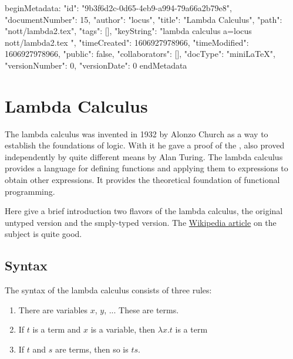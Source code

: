 beginMetadata:
{
    "id": "9b3f6d2c-0d65-4eb9-a994-79a66a2b79e8",
    "documentNumber": 15,
    "author": "locus",
    "title": "Lambda Calculus",
    "path": "nott/lambda2.tex",
    "tags": [],
    "keyString": "lambda calculus a=locus nott/lambda2.tex ",
    "timeCreated": 1606927978966,
    "timeModified": 1606927978966,
    "public": false,
    "collaborators": [],
    "docType": "miniLaTeX",
    "versionNumber": 0,
    "versionDate": 0
}
endMetadata

\setcounter{section}{4}

\section{Lambda Calculus}


\innertableofcontents

The lambda calculus was invented in 1932 by Alonzo Church as a way to establish the foundations of logic.  With it he gave a proof of the , also proved independently by quite different means by Alan Turing.  The lambda calculus provides a language for defining functions and applying them to expressions to obtain other expressions. It  provides the theoretical foundation of functional programming.

Here give a brief introduction two flavors of the lambda calculus, the original untyped version and the smply-typed version.  The \href{https://en.wikipedia.org/wiki/Lambda_calculus}{Wikipedia article} on the subject is quite good.  

\subsection{Syntax}

The syntax of the lambda calculus consists of three rules:

\begin{enumerate}

\item There are variables $x$, $y$, ...  These are terms.

\item If $t$ is a term and $x$ is a variable, then $\lambda x.t$ is a term

\item If $t$ and $s$ are terms, then so is $ts$.

\end{enumerate}


